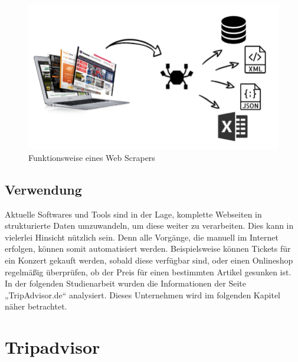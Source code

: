 \documentclass[a4paper,oneside,12pt]{report}
\begin{document}
				\begin{figure}[H]
					\centering
					\begin{minipage}[b]{0.6\textwidth}
						\includegraphics[width=\textwidth]{Bilder/Webcrawler.png}
					\end{minipage}
					\centering
					\caption[Funktionsweise eines Web Scrapers]{Funktionsweise eines Web Scrapers}
					\label{pic-webscraper2}
				\end{figure}
			
			
			\subsection{Verwendung}
			
				Aktuelle Softwares und Tools sind in der Lage, komplette Webseiten in strukturierte Daten umzuwandeln, um diese weiter zu verarbeiten. Dies kann in vielerlei Hinsicht nützlich sein. Denn alle Vorgänge, die manuell im Internet erfolgen, können somit automatisiert werden. Beispielsweise können Tickets für ein Konzert gekauft werden, sobald diese verfügbar sind, oder einen Onlineshop regelmäßig überprüfen, ob der Preis für einen bestimmten Artikel gesunken ist. \cite{bib-anzSterne}
				\\				
				In der folgenden Studienarbeit wurden die Informationen der Seite „TripAdvisor.de“ analysiert. Dieses Unternehmen wird im folgenden Kapitel näher betrachtet.
			
				
		\section{Tripadvisor}
	
\end{document}
